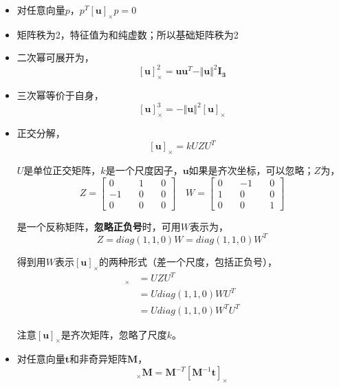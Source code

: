 \documentclass[hpyerref,UTF8,a4paper,titlepage,12pt,oneside]{ctexbook}
\theoremstyle{definition}
\begin{document}
	\begin{itemize}
		\item 对任意向量$p$，$p^T [\mathbf{u}]_{\times} p = 0$
		\item 矩阵秩为2，特征值为和纯虚数；所以基础矩阵秩为2
		\item 二次幂可展开为，
			$$
				[\mathbf{u}]_{\times}^2 = \mathbf{u}\mathbf{u}^T - \Vert\mathbf{u}\Vert^2 \mathbf{I_3}
			$$
		\item 三次幂等价于自身，
			$$
				[\mathbf{u}]_{\times}^3 = -\Vert\mathbf{u}\Vert^2[\mathbf{u}]_{\times}
			$$
		\item 正交分解，
			$$
				[\mathbf{u}]_{\times} = kUZU^T
			$$

			$U$是单位正交矩阵，$k$是一个尺度因子，$\mathbf{u}$如果是齐次坐标，可以忽略；$Z$为，
			$$
				Z = \begin{bmatrix}
					0 \quad& 1\quad& 0\\
					-1 \quad& 0\quad& 0\\
					0 \quad& 0\quad& 0
				\end{bmatrix}
				\quad
				 W = \begin{bmatrix}
					0 \quad& -1\quad& 0\\
					1 \quad& 0\quad& 0\\
					0 \quad& 0\quad& 1
				\end{bmatrix}
			$$

			是一个反称矩阵，\textbf{忽略正负号}时，可用$W$表示为，
			$$
				Z = diag(1,1,0)W = diag(1,1,0)W^T
			$$

			得到用$W$表示$[\mathbf{u}]_{\times}$的两种形式（差一个尺度，包括正负号），
			\begin{align}
				[\mathbf{u}]_{\times} &= UZU^T \label{inverse_decompose}\\
				&= U diag(1,1,0)WU^T\\
				&= U diag(1,1,0)W^TU^T
			\end{align}

			注意$[\mathbf{u}]_{\times}$是齐次矩阵，忽略了尺度$k$。

		\item 对任意向量$\mathbf{t}$和非奇异矩阵$\mathbf{M}$，
			\begin{equation}
				[\mathbf{t}]_{\times}\mathbf{M} = \mathbf{M}^{-T}\left[\mathbf{M}^{-1}\mathbf{t}\right]_{\times} \label {inver_m_p}
			\end{equation}
	\end{itemize}






\end{document}
